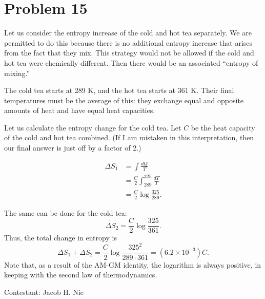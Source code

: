 \documentclass[12pt]{article}
\title{}
\date{}
\author{Jacob H. Nie}
\newcommand{\diff}{\textit{d}}
\begin{document}
\section*{Problem 15}

Let us consider the entropy increase of the cold and hot tea separately.  We are permitted to do this because there is no additional entropy increase that arises from the fact that they mix.  This strategy would not be allowed if the cold and hot tea were chemically different.  Then there would be an associated ``entropy of mixing.''

The cold tea starts at 289 K, and the hot tea starts at 361 K.  Their final temperatures must be the average of this: they exchange equal and opposite amounts of heat and have equal heat capacities.

Let us calculate the entropy change for the cold tea.  Let $C$ be the heat capacity of the cold and hot tea combined.  (If I am mistaken in this interpretation, then our final answer is just off by a factor of 2.)

\begin{align*}
	\Delta S_1 &= \int \frac{\diff Q}{T} \\
		   &= \frac{C}{2}\int_{289}^{325} \frac{\diff T}{T} \\
		   &= \frac{C}{2} \log \frac{325}{289}.
\end{align*}

The same can be done for the cold tea:
\[
	\Delta S_2 = \frac{C}{2}\log \frac{325}{361}.
\]
Thus, the total change in entropy is
\[
	\Delta S_1 + \Delta S_2 = \frac{C}{2} \log \frac{325^2}{289\cdot 361} = (6.2 \times 10^{-3})C.
\]
Note that, as a result of the AM-GM identity, the logarithm is always positive, in keeping with the second law of thermodynamics.

\vspace{1cm}

\hfill Contestant: Jacob H. Nie
\end{document}

